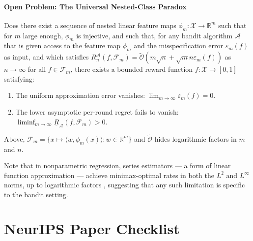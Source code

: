 \documentclass{article}
\numberwithin{theorem}{section}
\theoremstyle{definition}
\newcommand{\Fs}{\mathcal F}
\newcommand{\Os}{\mathcal O}
\newcommand{\Xs}{\mathcal X}
\begin{document}
\paragraph{Open Problem: The Universal Nested-Class Paradox}
Does there exist a sequence of nested linear feature maps $\phi_m : \Xs \to \mathbb{R}^m$ such that
for $m$ large enough, $\phi_m$ is injective, and such that, for any bandit algorithm $\mathscr A$ that is given access to the feature map $\phi_m$ and the misspecification error $\varepsilon_m(f)$ as input,
and which satisfies $R_n^{\mathscr A}(f,\Fs_m) = \widetilde{\Os}(m \sqrt{n}+ \sqrt{m}n \varepsilon_m(f))$ as $n\to\infty$ for all $f\in\Fs_m$,
there exists a bounded reward function $f:\Xs \to [0,1]$ satisfying:
\begin{enumerate}
    \item The uniform approximation error vanishes: $\lim_{m\to\infty} \varepsilon_m(f) = 0$.
    \item The lower asymptotic per-round regret fails to vanish: $\liminf_{m\to\infty}\underline R_{\mathscr A}(f,\Fs_m) > 0$.
\end{enumerate}
Above, $\Fs_m = \{ x \mapsto \langle w, \phi_m(x) \rangle : w \in \mathbb{R}^m \}$ and $\widetilde{\Os}$ hides logarithmic factors in $m$ and $n$.


Note that in nonparametric regression, series estimators — a form of linear function approximation — achieve minimax-optimal rates in both the $L^2$ and $L^\infty$ norms, up to logarithmic factors \citep{tsybakov2009introduction}, suggesting that any such limitation is specific to the bandit setting.



\newpage
\section*{NeurIPS Paper Checklist}
\end{document}

